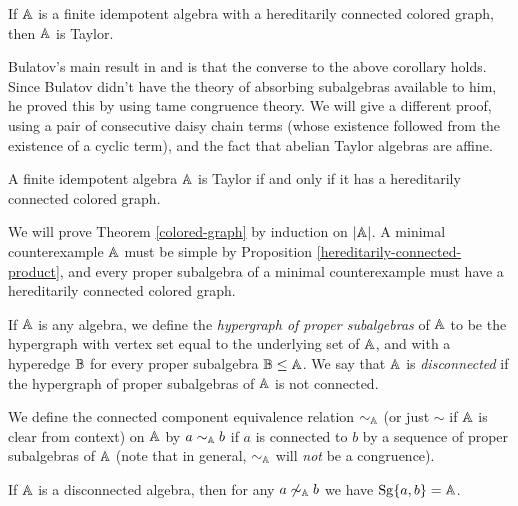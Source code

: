 \documentclass[letterpaper,11pt]{article}
\DeclareMathOperator{\Sg}{Sg}
\begin{document}
\begin{cor} If $\mathbb{A}$ is a finite idempotent algebra with a hereditarily connected colored graph, then $\mathbb{A}$ is Taylor.
\end{cor}

Bulatov's main result in \cite{colored-graph-prelim} and \cite{colored-graph} is that the converse to the above corollary holds. Since Bulatov didn't have the theory of absorbing subalgebras available to him, he proved this by using tame congruence theory. We will give a different proof, using a pair of consecutive daisy chain terms (whose existence followed from the existence of a cyclic term), and the fact that abelian Taylor algebras are affine.%

\begin{thm}\label{colored-graph} A finite idempotent algebra $\mathbb{A}$ is Taylor if and only if it has a hereditarily connected colored graph.
\end{thm}

We will prove Theorem \ref{colored-graph} by induction on $|\mathbb{A}|$. A minimal counterexample $\mathbb{A}$ must be simple by Proposition \ref{hereditarily-connected-product}, and every proper subalgebra of a minimal counterexample must have a hereditarily connected colored graph.

\begin{defn} If $\mathbb{A}$ is any algebra, we define the \emph{hypergraph of proper subalgebras} of $\mathbb{A}$ to be the hypergraph with vertex set equal to the underlying set of $\mathbb{A}$, and with a hyperedge $\mathbb{B}$ for every proper subalgebra $\mathbb{B} \le \mathbb{A}$. We say that $\mathbb{A}$ is \emph{disconnected} if the hypergraph of proper subalgebras of $\mathbb{A}$ is not connected.

We define the connected component equivalence relation $\sim_{\mathbb{A}}$ (or just $\sim$ if $\mathbb{A}$ is clear from context) on $\mathbb{A}$ by $a \sim_{\mathbb{A}} b$ if $a$ is connected to $b$ by a sequence of proper subalgebras of $\mathbb{A}$ (note that in general, $\sim_{\mathbb{A}}$ will \emph{not} be a congruence).
\end{defn}

\begin{prop} If $\mathbb{A}$ is a disconnected algebra, then for any $a \not\sim_{\mathbb{A}} b$ we have $\Sg\{a,b\} = \bA$.
\end{prop}
\end{document}
